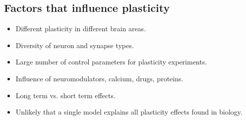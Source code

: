 \documentclass[main]{subfiles}
\begin{document}
\subsection{Factors that influence plasticity}
\begin{itemize}[noitemsep,nolistsep]
	\item Different plasticity in different brain areas.
	\item Diversity of neuron and synapse types.
	\item Large number of control parameters for plasticity experiments.
	\item Influence of neuromodulators, calcium, drugs, proteins.
	\item Long term vs. short term effects.
	\item Unlikely that a single model explains all plasticity effects found in biology.
\end{itemize}
\end{document}
